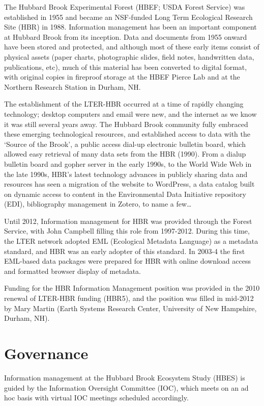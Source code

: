 \documentclass[
  letterpaper,
  DIV=11,
  numbers=noendperiod]{scrreprt}
\begin{document}
The Hubbard Brook Experimental Forest (HBEF; USDA Forest Service) was
established in 1955 and became an NSF-funded Long Term Ecological
Research Site (HBR) in 1988. Information management has been an
important component at Hubbard Brook from its inception. Data and
documents from 1955 onward have been stored and protected, and although
most of these early items consist of physical assets (paper charts,
photographic slides, field notes, handwritten data, publications, etc),
much of this material has been converted to digital format, with
original copies in fireproof storage at the HBEF Pierce Lab and at the
Northern Research Station in Durham, NH.

The establishment of the LTER-HBR occurred at a time of rapidly changing
technology; desktop computers and email were new, and the internet as we
know it was still several years away. The Hubbard Brook community fully
embraced these emerging technological resources, and established access
to data with the `Source of the Brook', a public access dial-up
electronic bulletin board, which allowed easy retrieval of many data
sets from the HBR (1990). From a dialup bulletin board and gopher server
in the early 1990s, to the World Wide Web in the late 1990s, HBR's
latest technology advances in publicly sharing data and resources has
seen a migration of the website to WordPress, a data catalog built on
dynamic access to content in the Environmental Data Initiative
repository (EDI), bibliography management in Zotero, to name a
few\ldots{}

Until 2012, Information management for HBR was provided through the
Forest Service, with John Campbell filling this role from 1997-2012.
During this time, the LTER network adopted EML (Ecological Metadata
Language) as a metadata standard, and HBR was an early adopter of this
standard. In 2003-4 the first EML-based data packages were prepared for
HBR with online download access and formatted browser display of
metadata.

Funding for the HBR Information Management position was provided in the
2010 renewal of LTER-HBR funding (HBR5), and the position was filled in
mid-2012 by Mary Martin (Earth Systems Research Center, University of
New Hampshire, Durham, NH).

\section{Governance}\label{governance}

Information management at the Hubbard Brook Ecosystem Study (HBES) is
guided by the Information Oversight Committee (IOC), which meets on an
ad hoc basis with virtual IOC meetings scheduled accordingly.
\end{document}
